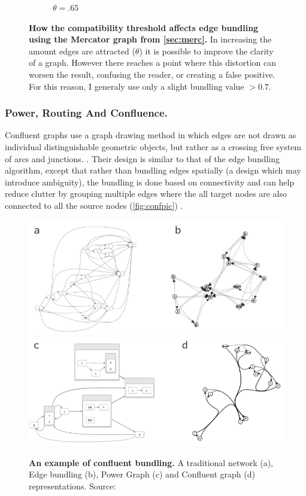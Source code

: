 \begin{figure}[H]
\begin{subfigure}[b]{.49\textwidth}
 \caption{$\theta = .65$}
 \end{subfigure}
        \caption{\textbf{How the compatibility threshold affects edge bundling using the Mercator graph from \autoref{sec:merc}.} In increasing the amount edges are attracted ($\theta$) it is possible to improve the clarity of a graph. However there reaches a point where this distortion can worsen the result, confusing the reader, or creating a false positive. For this reason, I generaly use only a slight bundling value $> 0.7$.}
      \label{fig:edgebundling}
\end{figure}

\subsubsection{Power, Routing And Confluence.}

Confluent graphs use a graph drawing method in which edges are not drawn as individual distinguishable geometric objects, but rather as a crossing free system of arcs and junctions. \citep{confluient19}. Their design is similar to that of the edge bundling algorithm, except that rather than bundling edges spatially (a design which may introduce ambiguity), the bundling is done based on connectivity and can help reduce clutter by grouping multiple edges where the all target nodes are also connected to all the source nodes (\autoref{fig:confpic}) \citep{confpic}. 

\begin{figure}[H]
     \centering
     \includegraphics[width=.75\textwidth]{figures_c1/layout/confluent/example2.png}\\
     \includegraphics[width=.75\textwidth]{figures_c1/layout/confluent/example.png}\\
        \caption{\textbf{An example of confluent bundling. } A traditional network (a), Edge bundling (b), Power Graph (c) and Confluent graph (d) representations. Source: \citep{confpic}}
      \label{fig:confpic}
\end{figure}

